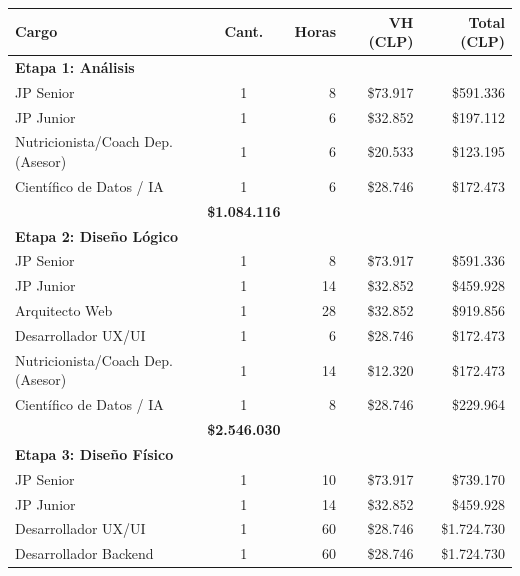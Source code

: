 \documentclass[12pt]{article}
\begin{document}
\begin{table}[h!]
    \centering
    \renewcommand{\arraystretch}{1.15}
    \footnotesize
    \begin{tabular}{|l|c|r|r|r|}
        \hline
        \rowcolor[HTML]{EFEFEF}
        \textbf{Cargo} & \textbf{Cant.} & \textbf{Horas} & \textbf{VH (CLP)} & \textbf{Total (CLP)} \\ \hline
        \multicolumn{5}{|l|}{\cellcolor[HTML]{E3F2FD}\textbf{Etapa 1: Análisis}} \\ \hline
        JP Senior & 1 & 8 & \$73.917 & \$591.336 \\ \hline
        JP Junior & 1 & 6 & \$32.852 & \$197.112 \\ \hline
        Nutricionista/Coach Dep. (Asesor) & 1 & 6 & \$20.533 & \$123.195 \\ \hline
        Científico de Datos / IA & 1 & 6 & \$28.746 & \$172.473 \\ \hline
        \rowcolor[HTML]{F3F3F3}
        \multicolumn{4}{|r|}{\textbf{Subtotal Análisis}} & \textbf{\$1.084.116} \\ \hline
        \multicolumn{5}{|l|}{\cellcolor[HTML]{E3F2FD}\textbf{Etapa 2: Diseño Lógico}} \\ \hline
        JP Senior & 1 & 8 & \$73.917 & \$591.336 \\ \hline
        JP Junior & 1 & 14 & \$32.852 & \$459.928 \\ \hline
        Arquitecto Web & 1 & 28 & \$32.852 & \$919.856 \\ \hline
        Desarrollador UX/UI & 1 & 6 & \$28.746 & \$172.473 \\ \hline
        Nutricionista/Coach Dep. (Asesor) & 1 & 14 & \$12.320 & \$172.473 \\ \hline
        Científico de Datos / IA & 1 & 8 & \$28.746 & \$229.964 \\ \hline
        \rowcolor[HTML]{F3F3F3}
        \multicolumn{4}{|r|}{\textbf{Subtotal Diseño Lógico}} & \textbf{\$2.546.030} \\ \hline
        \multicolumn{5}{|l|}{\cellcolor[HTML]{E3F2FD}\textbf{Etapa 3: Diseño Físico}} \\ \hline
        JP Senior & 1 & 10 & \$73.917 & \$739.170 \\ \hline
        JP Junior & 1 & 14 & \$32.852 & \$459.928 \\ \hline
        Desarrollador UX/UI & 1 & 60 & \$28.746 & \$1.724.730 \\ \hline
        Desarrollador Backend & 1 & 60 & \$28.746 & \$1.724.730 \\ \hline

\end{tabular}
\end{table}
\end{document}
